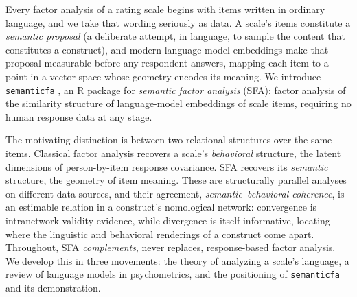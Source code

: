 Every factor analysis of a rating scale begins with items written in ordinary
language, and we take that wording seriously as data. A scale's items constitute a
\emph{semantic proposal} (a deliberate attempt, in language, to sample the
content that constitutes a construct), and modern language-model embeddings make
that proposal measurable before any respondent answers, mapping each item to a
point in a vector space whose geometry encodes its meaning. We introduce
\texttt{semanticfa} \citep{yanitski-westbury-2026}, an R package for
\emph{semantic factor analysis} (SFA): factor analysis of the
similarity structure of language-model embeddings of scale items, requiring no
human response data at any stage.

The motivating distinction is between two relational structures over the same
items. Classical factor analysis recovers a scale's \emph{behavioral} structure,
the latent dimensions of person-by-item response covariance. SFA recovers its
\emph{semantic} structure, the geometry of item meaning. These are structurally
parallel analyses on different data sources, and their agreement,
\emph{semantic--behavioral coherence}, is an estimable relation in a construct's
nomological network: convergence is intranetwork validity evidence, while
divergence is itself informative, locating where the linguistic and behavioral
renderings of a construct come apart. Throughout, SFA \emph{complements}, never
replaces, response-based factor analysis. We develop this in three movements: the
theory of analyzing a scale's language, a review of language models in
psychometrics, and the positioning of \texttt{semanticfa} and its demonstration.
